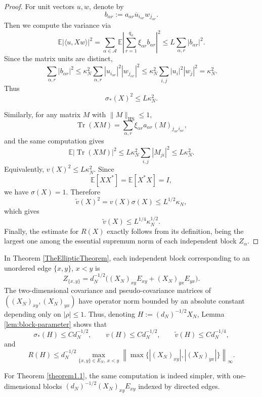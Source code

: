 \documentclass[11pt,reqno]{amsart}
\theoremstyle{plain}
\theoremstyle{remark}
\numberwithin{equation}{section}
\begin{document}
\begin{proof}
For unit vectors \(u,w\), denote by
\[
b_{\alpha r}:=a_{\alpha r}\overline{u}_{i_{\alpha r}}w_{j_{\alpha r}}.
\]
Then we compute the variance via
\[
\mathbb E|\langle u,Xw\rangle|^2
=
\sum_{\alpha\in\mathcal A}
\mathbb E\left|\sum_{r=1}^{q_\alpha}\xi_{\alpha r}b_{\alpha r}\right|^2
\le
L\sum_{\alpha,r}|b_{\alpha r}|^2.
\]
Since the matrix units are distinct,
\[
\sum_{\alpha,r}|b_{\alpha r}|^2
\le
\kappa_N^2
\sum_{\alpha,r}|u_{i_{\alpha r}}|^2|w_{j_{\alpha r}}|^2
\le
\kappa_N^2
\sum_{i,j}|u_i|^2|w_j|^2
=
\kappa_N^2.
\]
Thus
\[
\sigma_*(X)^2\le L\kappa_N^2.
\]

Similarly, for any matrix \(M\) with \(\|M\|_{\mathrm{HS}}\le1\),
\[
\operatorname{Tr}(XM)
=
\sum_{\alpha,r}\xi_{\alpha r}a_{\alpha r}(M)_{j_{\alpha r}i_{\alpha r}},
\]
and the same computation gives
\[
\mathbb E|\operatorname{Tr}(XM)|^2
\le
L\kappa_N^2\sum_{i,j}|M_{ji}|^2
\le
L\kappa_N^2.
\]
Equivalently, \(v(X)^2\le L\kappa_N^2\). Since
\[
\mathbb E[XX^*]=\mathbb E[X^*X]=I,
\]
we have \(\sigma(X)=1\). Therefore
\[
\widetilde v(X)^2=v(X)\sigma(X)\le L^{1/2}\kappa_N,
\]
which gives
\[
\widetilde v(X)\le L^{1/4}\kappa_N^{1/2}.
\]
Finally, the estimate for \(R(X)\) exactly follows from its definition, being the largest one among the essential
supremum norm of each independent block $Z_\alpha$. 
\end{proof}


In Theorem \ref{TheEllipticTheorem}, each independent block corresponding to an unordered edge
\(\{x,y\}\), \(x<y\) is
\[
Z_{\{x,y\}}
=
d_N^{-1/2}\bigl((X_N)_{xy}E_{xy}+(X_N)_{yx}E_{yx}\bigr).
\]
The two-dimensional covariance and pseudo-covariance matrices of
\(((X_N)_{xy},(X_N)_{yx})\) have operator norm bounded by an absolute constant depending
only on \(|\rho|\le1\). Thus, denoting $H:=(d_N)^{-1/2}X_N$, Lemma \ref{lem:block-parameter} shows that
\begin{equation}\label{4.44}
\sigma_*(H)\le C d_N^{-1/2},\qquad
v(H)\le C d_N^{-1/2},\qquad
\widetilde v(H)\le C d_N^{-1/4},
\end{equation}
and
\begin{equation}\label{4.5}
R(H)\le
d_N^{-1/2}
\max_{\{x,y\}\in E_N,\ x<y}
\left\|
\max\{|(X_N)_{xy}|, |(X_N)_{yx}|\}
\right\|_\infty .
\end{equation}

For Theorem \ref{theorem1.1}, the same computation is indeed simpler, with one-dimensional blocks $(d_N)^{-1/2}(X_N)_{xy}E_{xy}$ indexed by directed edges.
\end{document}
